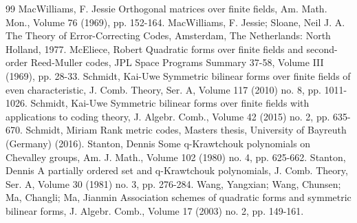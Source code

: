 \documentclass[10pt]{article}
\theoremstyle{definition}
\begin{document}
\begin{thebibliography}{99}
 MacWilliams, F. Jessie Orthogonal matrices over finite fields, Am. Math. Mon., Volume 76 (1969), pp. 152-164.
 MacWilliams, F. Jessie; Sloane, Neil J. A. The Theory of Error-Correcting Codes, Amsterdam, The Netherlands: North Holland, 1977.
 McEliece, Robert Quadratic forms over finite fields and second-order Reed-Muller codes, JPL Space Programs Summary 37-58, Volume III (1969), pp. 28-33.
 Schmidt, Kai-Uwe Symmetric bilinear forms over finite fields of even characteristic, J. Comb. Theory, Ser. A, Volume 117 (2010) no. 8, pp. 1011-1026.
 Schmidt, Kai-Uwe Symmetric bilinear forms over finite fields with applications to coding theory, J. Algebr. Comb., Volume 42 (2015) no. 2, pp. 635-670.
 Schmidt, Miriam Rank metric codes, Masters thesis, University of Bayreuth (Germany) (2016).
 Stanton, Dennis Some q-Krawtchouk polynomials on Chevalley groups, Am. J. Math., Volume 102 (1980) no. 4, pp. 625-662.
 Stanton, Dennis A partially ordered set and q-Krawtchouk polynomials, J. Comb. Theory, Ser. A, Volume 30 (1981) no. 3, pp. 276-284.
 Wang, Yangxian; Wang, Chunsen; Ma, Changli; Ma, Jianmin Association schemes of quadratic forms and symmetric bilinear forms, J. Algebr. Comb., Volume 17 (2003) no. 2, pp. 149-161.
\end{thebibliography}
\end{document}
